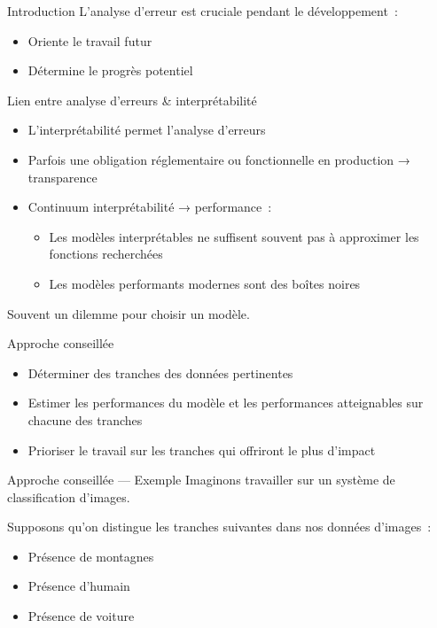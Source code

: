 \begin{frame}{Introduction}
  L'analyse d'erreur est cruciale pendant le développement~:

  \begin{itemize}
    \item Oriente le travail futur
    \item Détermine le progrès potentiel
  \end{itemize}
\end{frame}

\begin{frame}{Lien entre analyse d'erreurs \& interprétabilité}
  \begin{itemize}
    \item L'interprétabilité permet l'analyse d'erreurs
    \item Parfois une obligation réglementaire ou fonctionnelle en production → transparence
    \item Continuum interprétabilité → performance~:
      \begin{itemize}
        \item Les modèles interprétables ne suffisent souvent pas à approximer les fonctions recherchées
        \item Les modèles performants modernes sont des boîtes noires
      \end{itemize}
  \end{itemize}

  Souvent un dilemme pour choisir un modèle.
\end{frame}

\begin{frame}{Approche conseillée}
  \begin{itemize}
    \item Déterminer des tranches des données pertinentes
    \item Estimer les performances du modèle et les performances atteignables sur chacune des tranches
    \item Prioriser le travail sur les tranches qui offriront le plus d'impact
  \end{itemize}
\end{frame}

\begin{frame}{Approche conseillée — Exemple}
  Imaginons travailler sur un système de classification d'images.

  Supposons qu'on distingue les tranches suivantes dans nos données d'images~:

  \begin{itemize}
    \item Présence de montagnes
    \item Présence d'humain
    \item Présence de voiture
  \end{itemize}
\end{frame}

